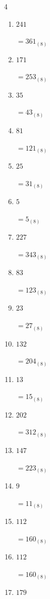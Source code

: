 \begin{multicols}{4}
\begin{enumerate}
  \item $241$

        $=361_{(8)}$

  \item $171$

        $=253_{(8)}$

  \item $35$

        $=43_{(8)}$

  \item $81$

        $=121_{(8)}$

  \item $25$

        $=31_{(8)}$

\columnbreak %

  \item $5$

        $=5_{(8)}$

  \item $227$

        $=343_{(8)}$

  \item $83$

        $=123_{(8)}$

  \item $23$

        $=27_{(8)}$

  \item $132$

        $=204_{(8)}$

  \item $13$

        $=15_{(8)}$

  \item $202$

        $=312_{(8)}$

  \item $147$

        $=223_{(8)}$

  \item $9$

        $=11_{(8)}$

  \item $112$

        $=160_{(8)}$

  \item $112$

        $=160_{(8)}$

  \item $179$


\end{enumerate}
\end{multicols}
